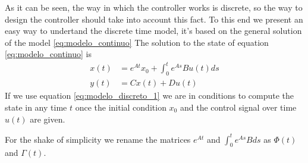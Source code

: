 \documentclass[nols]{tufte-handout}
\theoremstyle{definition}
\begin{document}
As it can be seen, the way in which the controller works is discrete, so the way to design the controller should take into account this fact.
To this end we present an easy  way to undertand the discrete time model, it's based on the general solution of the model \ref{eq:modelo_continuo}  
The solution to the state of equation \ref{eq:modelo_continuo} is 
\begin{align}
    x(t)&=e^{At}x_0+\int_0^t e^{As}Bu(t)ds\nonumber\\
    y(t)&=Cx(t)+Du(t)\label{eq:modelo_discreto_1}
\end{align}
If we use equation \ref{eq:modelo_discreto_1} we are in conditions to compute the state in any time $t$ once the initial condition $x_0$ and the control signal over time $u(t)$ are given. 

For the shake of simplicity we rename the matrices $e^{At}$  and $\displaystyle\int_0^t e^{As}Bds$ as $\Phi(t)$ and $\Gamma(t)$.

\end{document}
